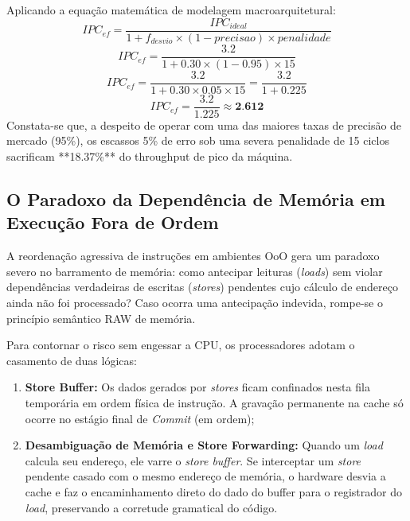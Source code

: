 \documentclass[12pt,a4paper]{article}
\begin{document}
Aplicando a equação matemática de modelagem macroarquitetural:
\begin{equation}
IPC_{ef} = \frac{IPC_{ideal}}{1 + f_{desvio} \times (1 - precisao) \times penalidade}
\end{equation}
\begin{equation}
IPC_{ef} = \frac{3.2}{1 + 0.30 \times (1 - 0.95) \times 15}
\end{equation}
\begin{equation}
IPC_{ef} = \frac{3.2}{1 + 0.30 \times 0.05 \times 15} = \frac{3.2}{1 + 0.225}
\end{equation}
\begin{equation}
IPC_{ef} = \frac{3.2}{1.225} \approx \textbf{2.612}
\end{equation}
Constata-se que, a despeito de operar com uma das maiores taxas de precisão de mercado (95\%), os escassos 5\% de erro sob uma severa penalidade de 15 ciclos sacrificam **18.37\%** do throughput de pico da máquina.

\subsection{O Paradoxo da Dependência de Memória em Execução Fora de Ordem}
A reordenação agressiva de instruções em ambientes OoO gera um paradoxo severo no barramento de memória: como antecipar leituras (\textit{loads}) sem violar dependências verdadeiras de escritas (\textit{stores}) pendentes cujo cálculo de endereço ainda não foi processado? Caso ocorra uma antecipação indevida, rompe-se o princípio semântico RAW de memória.

Para contornar o risco sem engessar a CPU, os processadores adotam o casamento de duas lógicas:
\begin{enumerate}
    \item \textbf{Store Buffer:} Os dados gerados por \textit{stores} ficam confinados nesta fila temporária em ordem física de instrução. A gravação permanente na cache só ocorre no estágio final de \textit{Commit} (em ordem);
    \item \textbf{Desambiguação de Memória e Store Forwarding:} Quando um \textit{load} calcula seu endereço, ele varre o \textit{store buffer}. Se interceptar um \textit{store} pendente casado com o mesmo endereço de memória, o hardware desvia a cache e faz o encaminhamento direto do dado do buffer para o registrador do \textit{load}, preservando a corretude gramatical do código.
\end{enumerate}
\end{document}
